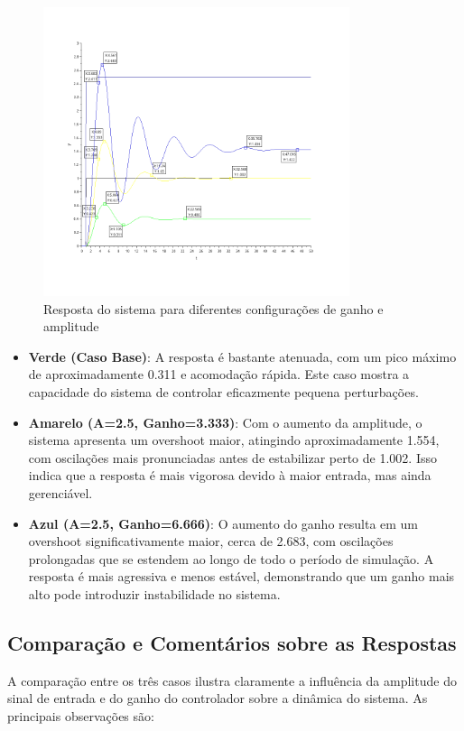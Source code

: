 \begin{figure}[H]
    \centering
    \includegraphics[width=0.8\textwidth]{5-atividade/assets/simulation-c.png}
    \caption{Resposta do sistema para diferentes configurações de ganho e amplitude}
    \label{fig:response_comparison}
\end{figure}

\begin{itemize}
    \item \textbf{Verde (Caso Base)}: A resposta é bastante atenuada, com um pico máximo de aproximadamente 0.311 e acomodação rápida. Este caso mostra a capacidade do sistema de controlar eficazmente pequena perturbações.

    \item \textbf{Amarelo (A=2.5, Ganho=3.333)}: Com o aumento da amplitude, o sistema apresenta um overshoot maior, atingindo aproximadamente 1.554, com oscilações mais pronunciadas antes de estabilizar perto de 1.002. Isso indica que a resposta é mais vigorosa devido à maior entrada, mas ainda gerenciável.

    \item \textbf{Azul (A=2.5, Ganho=6.666)}: O aumento do ganho resulta em um overshoot significativamente maior, cerca de 2.683, com oscilações prolongadas que se estendem ao longo de todo o período de simulação. A resposta é mais agressiva e menos estável, demonstrando que um ganho mais alto pode introduzir instabilidade no sistema.
\end{itemize}

\subsection{Comparação e Comentários sobre as Respostas}
A comparação entre os três casos ilustra claramente a influência da amplitude do sinal de entrada e do ganho do controlador sobre a dinâmica do sistema. As principais observações são:

